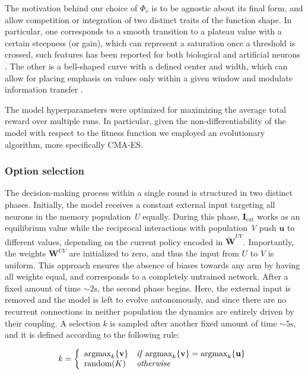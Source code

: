 The motivation behind our choice of $\Phi_{v}$ is to be agnostic about its final form, and allow competition or integration of two distinct traits of the function shape.
In particular, one corresponds to a smooth transition to a plateau value with a certain steepness (or gain), which can represent a saturation once a threshold is crossed, such features has been reported for both biological and artificial neurons \cite{ockerFlexibleNeuralConnectivity2020, apicellaSurveyModernTrainable2021}.
The other is a bell-shaped curve with a defined center and width, which can allow for placing emphasis on values only within a given window and modulate information transfer \cite{millerCombinedMechanismsNeural2019}.

The model hyperparameters were optimized for maximizing the average total reward over multiple runs. In particular, given the non-differentiability of the model with respect to the fitness function we employed an evolutionary algorithm, more specifically CMA-ES.

\subsubsection{Option selection}
The decision-making process within a single round is structured in two distinct phases. Initially, the model receives a constant external input targeting all neurons in the memory population \textit{U} equally.
During this phase, $\textbf{I}_{\text{ext}}$ works as an equilibrium value while the reciprocal interactions with population \textit{V} push $\textbf{u}$ to different values, depending on the current policy encoded in $\tilde{\textbf{W}}^{UV}$.
Importantly, the weights $\textbf{W}^{UV}$ are initialized to zero, and thus the input from $U$ to $V$ is uniform. This approach ensures the absence of biases towards any arm by having all weights equal, and corresponds to a completely untrained network.
After a fixed amount of time $\sim 2 \text{s}$, the second phase begins. Here, the external input is removed and the model is left to evolve autonomously, and since there are no recurrent connections in neither population the dynamics are entirely driven by their coupling.
A selection $k$ is sampled after another fixed amount of time $\sim 5 \text{s}$, and it is defined according to the following rule:

\begin{equation*}
    k =
    \left\{
        \begin{array}{ll}
            \text{argmax}_{k}\{\textbf{v}\} & \text{\textit{if}}\; \text{argmax}_{k} \{\textbf{v}\} = \text{argmax}_{k} \{\textbf{u}\} \\
            \text{random}(K) & \text{\textit{otherwise}}
        \end{array}
    \right.
\end{equation*}


